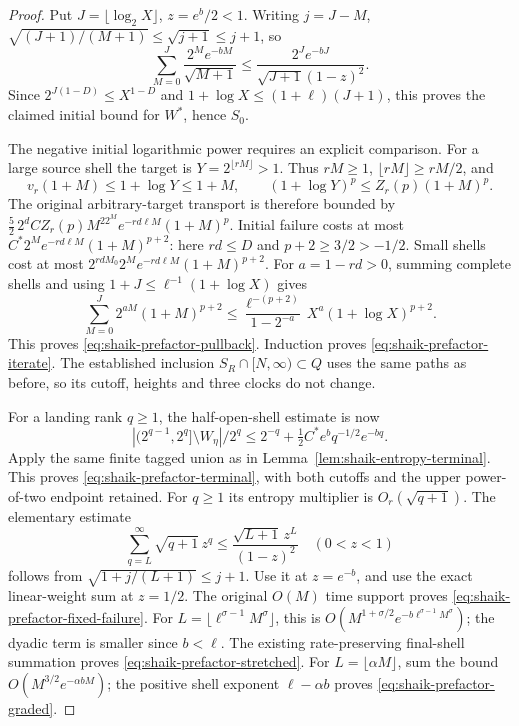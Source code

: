 \documentclass[11pt]{article}
\theoremstyle{remark}\newtheorem{remark}[proposition]{Remark}
\begin{document}
\begin{proof}
Put \(J=\lfloor\log_2X\rfloor\), \(z=e^b/2<1\). Writing \(j=J-M\),
\(\sqrt{(J+1)/(M+1)}\le\sqrt{j+1}\le j+1\), so
\[
 \sum_{M=0}^J\frac{2^Me^{-bM}}{\sqrt{M+1}}
 \le \frac{2^Je^{-bJ}}{\sqrt{J+1}(1-z)^2}.
\]
Since \(2^{J(1-D)}\le X^{1-D}\) and
\(1+\log X\le(1+\ell)(J+1)\), this proves the claimed initial bound
for \(W^*\), hence \(S_0\).

The negative initial logarithmic power requires an explicit comparison.
For a large source shell the target is \(Y=2^{\lfloor rM\rfloor}>1\).
Thus \(rM\ge1\), \(\lfloor rM\rfloor\ge rM/2\), and
\[
 v_r(1+M)\le1+\log Y\le1+M,\qquad
 (1+\log Y)^p\le Z_r(p)(1+M)^p.
\]
The original arbitrary-target transport is therefore bounded by
\(\frac52\,2^d CZ_r(p)M^22^Me^{-rd\ell M}(1+M)^p\).
Initial failure costs at most \(C^*2^Me^{-rd\ell M}(1+M)^{p+2}\):
here \(rd\le D\) and \(p+2\ge3/2>-1/2\).
Small shells cost at most
\(2^{rdM_0}2^Me^{-rd\ell M}(1+M)^{p+2}\).
For \(a=1-rd>0\), summing complete shells and using
\(1+J\le\ell^{-1}(1+\log X)\) gives
\[
 \sum_{M=0}^J 2^{aM}(1+M)^{p+2}
 \le\frac{\ell^{-(p+2)}}{1-2^{-a}}\,
             X^a(1+\log X)^{p+2}.
\]
This proves \eqref{eq:shaik-prefactor-pullback}. Induction proves
\eqref{eq:shaik-prefactor-iterate}. The established inclusion
\(S_R\cap[N,\infty)\subset Q\) uses the same paths as before,
so its cutoff, heights and three clocks do not change.

For a landing rank \(q\ge1\), the half-open-shell estimate is now
\[
 |(2^{q-1},2^q]\setminus W_\eta|/2^q
 \le2^{-q}+\tfrac12 C^*e^b q^{-1/2}e^{-bq}.
\]
Apply the same finite tagged union as in
Lemma~\ref{lem:shaik-entropy-terminal}. This proves
\eqref{eq:shaik-prefactor-terminal}, with both cutoffs and the
upper power-of-two endpoint retained.
For \(q\ge1\) its entropy multiplier is \(O_r(\sqrt{q+1})\).
The elementary estimate
\[
 \sum_{q=L}^\infty\sqrt{q+1}\,z^q
 \le\frac{\sqrt{L+1}\,z^L}{(1-z)^2}\quad(0<z<1)
\]
follows from \(\sqrt{1+j/(L+1)}\le j+1\).
Use it at \(z=e^{-b}\), and use the exact linear-weight sum at
\(z=1/2\). The original \(O(M)\) time support proves
\eqref{eq:shaik-prefactor-fixed-failure}.
For \(L=\lfloor\ell^{\sigma-1}M^\sigma\rfloor\), this is
\(O(M^{1+\sigma/2}e^{-b\ell^{\sigma-1}M^\sigma})\);
the dyadic term is smaller since \(b<\ell\).
The existing rate-preserving final-shell summation proves
\eqref{eq:shaik-prefactor-stretched}. For \(L=\lfloor\alpha M\rfloor\),
sum the bound \(O(M^{3/2}e^{-\alpha bM})\);
the positive shell exponent \(\ell-\alpha b\) proves
\eqref{eq:shaik-prefactor-graded}.
\end{proof}
\end{document}
